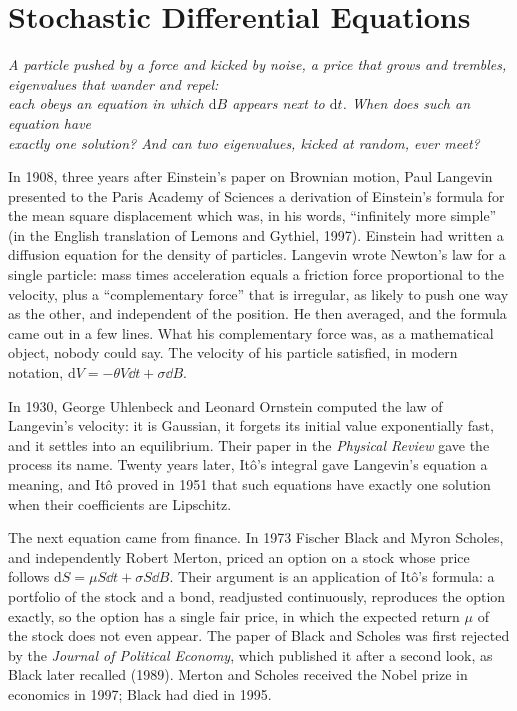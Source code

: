 \chapter{Stochastic Differential Equations}

\begin{center}\itshape
A particle pushed by a force and kicked by noise, a price that grows and trembles, eigenvalues that wander and repel:\\
each obeys an equation in which $\mathrm dB$ appears next to $\mathrm dt$. When does such an equation have\\
exactly one solution? And can two eigenvalues, kicked at random, ever meet?
\end{center}

In 1908, three years after Einstein's paper on Brownian motion, Paul Langevin presented to the Paris Academy of Sciences a derivation of Einstein's formula for the mean square displacement which was,
in his words, ``infinitely more simple'' (in the English translation of Lemons and Gythiel, 1997). Einstein had written a diffusion equation for the density of particles. Langevin wrote Newton's law for
a single particle: mass times acceleration equals a friction force proportional to the velocity, plus a ``complementary force'' that is irregular, as likely to push one way as the other, and
independent of the position. He then averaged, and the formula came out in a few lines. What his complementary force was, as a mathematical object, nobody could say. The velocity of his particle
satisfied, in modern notation, $\mathrm dV=-\theta V\dd t+\sigma\dd B$.

In 1930, George Uhlenbeck and Leonard Ornstein computed the law of Langevin's velocity: it is Gaussian, it forgets its initial value exponentially fast, and it settles into an equilibrium. Their paper
in the \emph{Physical Review} gave the process its name. Twenty years later, It\^o's integral gave Langevin's equation a meaning, and It\^o proved in 1951 that such equations have exactly one solution
when their coefficients are Lipschitz.

The next equation came from finance. In 1973 Fischer Black and Myron Scholes, and independently Robert Merton, priced an option on a stock whose price follows $\mathrm dS=\mu S\dd t+\sigma S\dd B$. Their
argument is an application of It\^o's formula: a portfolio of the stock and a bond, readjusted continuously, reproduces the option exactly, so the option has a single fair price, in which the
expected return $\mu$ of the stock does not even appear. The paper of Black and Scholes was first rejected by the \emph{Journal of Political Economy}, which published it after a second look, as Black
later recalled (1989). Merton and Scholes received the Nobel prize in economics in 1997; Black had died in 1995.

